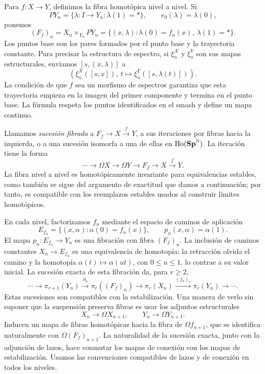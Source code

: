 \begin{sol}
Para $f\colon X\to Y$, definimos la fibra homotópica nivel a nivel. Si
\[
PY_n=\{\lambda\colon I\to Y_n:\lambda(1)=*\},
\qquad e_0(\lambda)=\lambda(0),
\]
ponemos
\[
(F_f)_n=X_n\times_{Y_n}PY_n
=\{(x,\lambda):\lambda(0)=f_n(x),\ \lambda(1)=*\}.
\]
Los puntos base son los pares formados por el punto base y la trayectoria constante. Para precisar la estructura de espectro, si $\xi_n^X$ y $\xi_n^Y$ son sus mapas estructurales, enviamos $[s,(x,\lambda)]$ a
\[
\left(\xi_n^X([s,x]),\ t\longmapsto\xi_n^Y([s,\lambda(t)])\right).
\]
La condición de que $f$ sea un morfismo de espectros garantiza que esta trayectoria empieza en la imagen del primer componente y termina en el punto base. La fórmula respeta los puntos identificados en el smash y define un mapa continuo.

Llamamos \emph{sucesión fibrada} a $F_f\to X\xrightarrow{f}Y$, a sus iteraciones por fibras hacia la izquierda, o a una sucesión isomorfa a una de ellas en $\operatorname{Ho}(\mathbf{Sp}^{\mathbb N})$. La iteración tiene la forma
\[
\cdots\longrightarrow\Omega X\longrightarrow\Omega Y
\longrightarrow F_f\longrightarrow X\xrightarrow{f}Y.
\]
La fibra nivel a nivel es homotópicamente invariante para equivalencias estables, como también se sigue del argumento de exactitud que damos a continuación; por tanto, es compatible con los reemplazos estables usados al construir límites homotópicos.

En cada nivel, factorizamos $f_n$ mediante el espacio de caminos de aplicación
\[
E_{f_n}=\{(x,\alpha):\alpha(0)=f_n(x)\},
\qquad p_n(x,\alpha)=\alpha(1).
\]
El mapa $p_n\colon E_{f_n}\to Y_n$ es una fibración con fibra $(F_f)_n$. La inclusión de caminos constantes $X_n\to E_{f_n}$ es una equivalencia de homotopía: la retracción olvida el camino y la homotopía $\alpha(t)\mapsto\alpha(ut)$, con $0\le u\le1$, lo contrae a su valor inicial. La sucesión exacta de esta fibración da, para $r\ge2$,
\[
\cdots\longrightarrow\pi_{r+1}(Y_n)
\xrightarrow{\partial_n}\pi_r((F_f)_n)
\longrightarrow\pi_r(X_n)
\xrightarrow{(f_n)_*}\pi_r(Y_n)\longrightarrow\cdots.
\]
Estas sucesiones son compatibles con la estabilización. Una manera de verlo sin suponer que la suspensión preserva fibras es usar los adjuntos estructurales
\[
X_n\longrightarrow\Omega X_{n+1},\qquad
Y_n\longrightarrow\Omega Y_{n+1}.
\]
Inducen un mapa de fibras homotópicas hacia la fibra de $\Omega f_{n+1}$, que se identifica naturalmente con $\Omega(F_f)_{n+1}$. La naturalidad de la sucesión exacta, junto con la adjunción de lazos, hace conmutar los mapas de conexión con los mapas de estabilización. Usamos las convenciones compatibles de lazos y de conexión en todos los niveles.


\end{sol}
